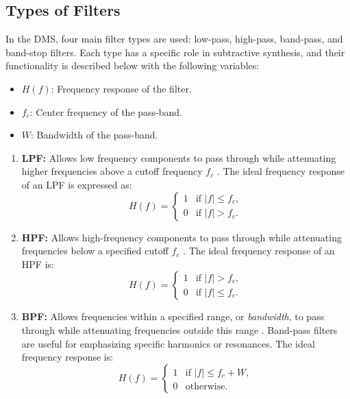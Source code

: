\documentclass[12pt]{article}
\begin{document}
\subsection{Types of Filters}
In the DMS, four main filter types are used: low-pass, high-pass, band-pass, and band-stop filters. Each type has a specific role in subtractive synthesis, and their functionality is described below with the following variables:
\begin{itemize}
    \item $H(f)$: Frequency response of the filter.
    \item \(f_c\): Center frequency of the pass-band.
    \item \(W\): Bandwidth of the pass-band.
\end{itemize}

\begin{enumerate}
    \item \textbf{LPF:} Allows low frequency components to pass through while attenuating higher frequencies above a cutoff frequency \(f_c\) \cite{TTEM}. The ideal frequency response of an LPF is expressed as:
\begin{equation}
    H(f) = 
    \begin{cases} 
    1 & \text{if } |f| \leq f_c, \\
    0 & \text{if } |f| > f_c.
    \end{cases}
\end{equation}

\item \textbf{HPF:} Allows high-frequency components to pass through while attenuating frequencies below a specified cutoff \(f_c\) \cite{TTEM}. The ideal frequency response of an HPF is:
\begin{equation}
    H(f) = 
    \begin{cases} 
    1 & \text{if } |f| > f_c, \\
    0 & \text{if } |f| \leq f_c.
    \end{cases}
\end{equation}

\item \textbf{BPF:} Allows frequencies within a specified range, or \textit{bandwidth}, to pass through while attenuating frequencies outside this range \cite{TTEM}. Band-pass filters are useful for emphasizing specific harmonics or resonances. The ideal frequency response is:
\begin{equation}
    H(f) = 
    \begin{cases} 
    1 & \text{if } |f| \leq f_c + W, \\
    0 & \text{otherwise}.
    \end{cases}
\end{equation}


\end{enumerate}
\end{document}
